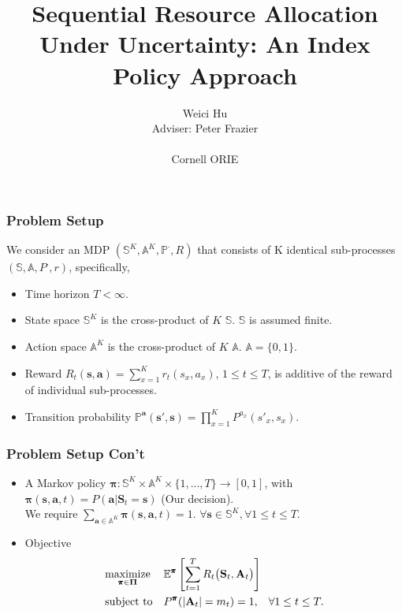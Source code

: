 \documentclass{beamer}
\newcommand{\av}{\mathbf{a}}
\newcommand{\allp}{\pmb{\pi}}
\newcommand{\allpset}{\mathbf{\Pi}}
\newcommand{\allstates}{\mathbb{S}^K}
\newcommand{\allstate}{\mathbf{s}}
\newcommand{\allstater}{\mathbf{S}}
\newcommand{\allactions}{\mathbb{A}^K}
\newcommand{\allaction}{\av}
\newcommand{\allar}{\mathbf{A}}
\newcommand{\allpr}{\mathbb{P}}
\newcommand{\allr}{R}
\newcommand{\subr}{r}
\newcommand{\substates}{\mathbb{S}}
\newcommand{\substate}{s}
\newcommand{\subactions}{\mathbb{A}}
\newcommand{\subpr}{P}
\newcommand{\subaction}{a}
\begin{document}
\title{Sequential Resource Allocation Under Uncertainty: An Index Policy Approach}
\author{Weici Hu\\
Adviser: Peter Frazier\\
\hspace{1mm}\\
Cornell ORIE}
\begin{frame}
   \maketitle
\end{frame}

\begin{frame}
\frametitle{Problem Setup}
We consider an MDP $(\allstates,\allactions,\allpr^{\cdot},\allr)$ that consists of K identical sub-processes $(\substates,\subactions,\subpr^{\cdot},\subr)$, specifically,
\begin{itemize}
\item Time horizon $T<\infty$.
\item State space $\allstates$ is the cross-product of $K$ $\substates$. $\substates$ is assumed finite.
\item Action space $\allactions$ is the cross-product of $K$ $\subactions$. $\subactions=\{0,1\}$.
\item Reward $\allr_t(\allstate,\allaction) = \sum_{x=1}^K \subr_t(\substate_x,\subaction_x)$, $1\leq t\leq T$, is additive of the reward of individual sub-processes.
\item Transition probability $\allpr^{\allaction}(\allstate',\allstate) = \prod_{x=1}^{K}\subpr^{\subaction_x}(\substate'_x,\substate_x)$.
\end{itemize}
\end{frame}

\begin{frame}
\frametitle{Problem Setup Con't}
\begin{itemize}
\item A Markov policy $\allp:\allstates\times \allactions \times \{1,...,T\} \rightarrow [0,1]$, with $\allp(\allstate,\allaction,t) = P(\allaction|\allstater_t=\allstate)$ (Our decision).\\ We require $\sum_{\allaction\in\allactions}\allp(\allstate,\allaction,t)=1$.
$\forall \allstate\in\allstates, \forall 1\leq t\leq T$.
\item Objective
\begin{equation}\label{prime}
\begin{aligned}
& \underset{\allp\in\allpset}{\text{maximize}}
& & \mathbb{E}^{\allp}\left[\sum_{t=1}^{T}\allr_t\big(\allstater_t,\allar_t\big)\right] \\
& \text{subject to}
& & P^{\allp}(|\allar_t|=m_t)=1, \hspace{3mm}\forall 1\leq t\leq T .
\end{aligned}
\end{equation}
\end{itemize}
\end{frame}
\end{document}

